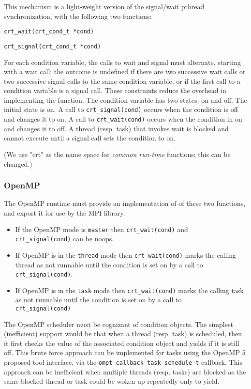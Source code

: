 This mechanism is a light-weight version of the 
signal/wait pthread synchronization, with the following two functions:

\texttt{crt\_wait(crt\_cond\_t *cond)}

\texttt{crt\_signal(crt\_cond\_t *cond)}

For each condition variable, the calls to wait and signal must alternate, 
starting with a 
wait call; the outcome is undefined if there are two successive wait calls 
or two successive signal calls to the same condition variable, or if the first 
call to a condition variable
is a signal call. 
These constraints reduce the overhead in implementing the function.
The condition variable  has two states: on and off. The initial state is 
on. A call to 
\texttt{crt\_signal(cond)} occurs when the condition is off  and changes it 
to 
on. A call 
to 
\texttt{crt\_wait(cond)} occurs when the condition in on
and changes it to off. 
A thread (resp. task) that invokes wait is blocked and cannot execute until a 
signal call sets the condition to on.

 (We use "crt" as the name space for \emph{common run-time} functions; this can 
 be changed.)
	
\subsubsection{OpenMP}

The OpenMP runtime must provide an implementation of of these two functions, 
and export it for use by the MPI library.

\begin{itemize}
	\item 
If the OpenMP mode is \texttt{master} then \texttt{crt\_wait(cond)}  and\\
\texttt{crt\_signal(cond)} can be noops. 
\item
If OpenMP is in the \texttt{thread} mode then \texttt{crt\_wait(cond)}  marks 
the calling thread as not runnable until the condition is set on by a call to 
\texttt{crt\_signal(cond)}.
\item
If OpenMP is in the \texttt{task} mode then \texttt{crt\_wait(cond)}  marks 
the calling task as not runnable until the condition is set on by a call to\\
\texttt{crt\_signal(cond)}
\end{itemize}	
 
The OpenMP scheduler must be cognizant of condition objects. The simplest 
(inefficient) support would be that when a thread (resp. task) is scheduled, 
then it first checks the value of the associated condition object and yields if 
it is 
still 
off. This brute force approach can be implemented for tasks using the 
OpenMP 5 
proposed tool interface, via the \texttt{ompt\_callback\_task\_schedule\_t} 
callback. This approach can be inefficient when multiple threads (resp. tasks) 
are blocked as the same blocked thread or task could be woken up repeatedly 
only to yield.

